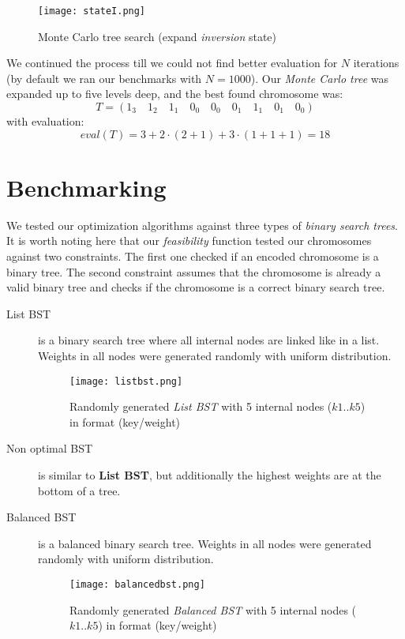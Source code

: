 \documentclass[12pt]{article}
\begin{document}
\begin{figure}
\centering
\texttt{[image: stateI.png]}
\caption{Monte Carlo tree search (expand \textit{inversion} state)}
\label{fig:stateI}
\end{figure}

We continued the process till we could not find better evaluation for $N$ iterations (by default we ran our benchmarks with $N = 1000$). Our \textit{Monte Carlo tree} was expanded up to five levels deep, and the best found chromosome was:
\[
    T = (1_3 \quad 1_2 \quad 1_1 \quad 0_0 \quad 0_0 \quad 0_1 \quad 1_1 \quad 0_1 \quad 0_0)
\]
with evaluation:
\[
    eval(T) = 3 + 2\cdot(2 + 1) + 3\cdot(1 + 1 + 1) = 18
\]


\section{Benchmarking}
We tested our optimization algorithms against three types of \textit{binary search trees}. It is worth noting here that our \textit{feasibility} function tested our chromosomes against two constraints. The first one checked if an encoded chromosome is a binary tree. The second constraint assumes that the chromosome is already a valid binary tree and checks if the chromosome is a correct binary search tree.

\begin{description}
\item[List BST] is a binary search tree where all internal nodes are linked like in a list. Weights in all nodes were generated randomly with uniform distribution.
\begin{figure}[ht]
\centering
\texttt{[image: listbst.png]}
\caption{Randomly generated \textit{List BST} with 5 internal nodes ($k1..k5$) in format (key/weight)}
\label{fig:listbst}
\end{figure}


\item[Non optimal BST] is similar to \textbf{List BST}, but additionally the highest weights are at the bottom of a tree.
\item[Balanced BST] is a balanced binary search tree. Weights in all nodes were generated randomly with uniform distribution.
\begin{figure}[ht]
\centering
\texttt{[image: balancedbst.png]}
\caption{Randomly generated \textit{Balanced BST} with 5 internal nodes ($k1..k5$) in format (key/weight)}
\label{fig:balancedbst}
\end{figure}
\end{description}
\end{document}
